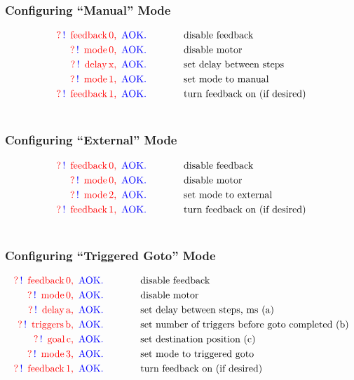 \documentclass[10pt]{article}
\newcommand{\comm}[3]{
\nonumber \textcolor{red}{?} \, \textcolor{blue}{!} \, \textcolor{red}{\text{ #1}} \,\textcolor{red}{\text{#2, }} \, \textcolor{blue}{\text{AOK.}} \, & \text{\hspace{0.5in}#3}}
\begin{document}
\subsubsection{Configuring ``Manual'' Mode}
\begin{align}
\comm{feedback}{0}{disable feedback} \\
\comm{mode}{0}{disable motor} \\
\comm{delay}{x}{set delay between steps} \\
\comm{mode}{1}{set mode to manual} \\
\comm{feedback}{1}{turn feedback on (if desired)} \\
\nonumber
\end{align}

\subsubsection{Configuring ``External'' Mode}
\begin{align}
\comm{feedback}{0}{disable feedback} \\
\comm{mode}{0}{disable motor} \\
\comm{mode}{2}{set mode to external} \\
\comm{feedback}{1}{turn feedback on (if desired)} \\
\nonumber
\end{align}

\subsubsection{Configuring ``Triggered Goto'' Mode}
\begin{align}
\comm{feedback}{0}{disable feedback} \\
\comm{mode}{0}{disable motor} \\
\comm{delay}{a}{set delay between steps, ms (a)} \\
\comm{triggers}{b}{set number of triggers before goto completed (b)} \\
\comm{goal}{c}{set destination position (c)} \\
\comm{mode}{3}{set mode to triggered goto} \\
\comm{feedback}{1}{turn feedback on (if desired)} \\
\nonumber
\end{align}
\end{document}
